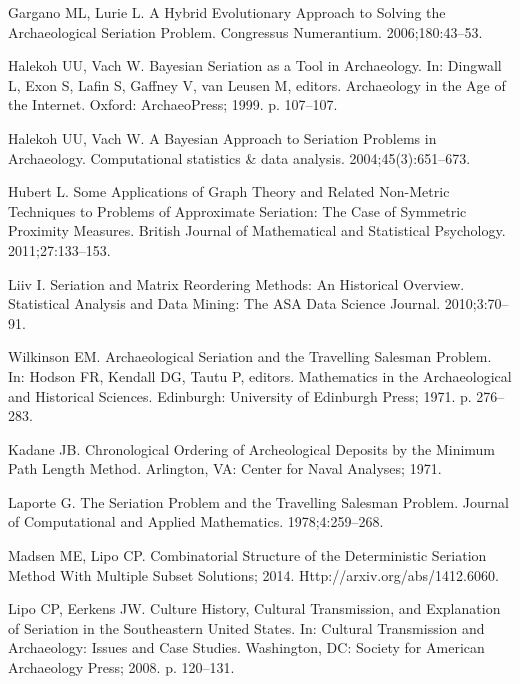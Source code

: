 \documentclass[10pt,letterpaper]{article}
\begin{document}
\begin{thebibliography}{10}
Gargano ML, Lurie L.
\newblock A Hybrid Evolutionary Approach to Solving the Archaeological
  Seriation Problem.
\newblock Congressus Numerantium. 2006;180:43--53.

Halekoh UU, Vach W.
\newblock Bayesian Seriation as a Tool in Archaeology.
\newblock In: Dingwall L, Exon S, Lafin S, Gaffney V, van Leusen M, editors.
  Archaeology in the Age of the Internet. Oxford: ArchaeoPress; 1999. p.
  107--107.

Halekoh UU, Vach W.
\newblock A Bayesian Approach to Seriation Problems in Archaeology.
\newblock Computational statistics \& data analysis. 2004;45(3):651--673.

Hubert L.
\newblock Some Applications of Graph Theory and Related Non-Metric Techniques
  to Problems of Approximate Seriation: The Case of Symmetric Proximity
  Measures.
\newblock British Journal of Mathematical and Statistical Psychology.
  2011;27:133--153.

Liiv I.
\newblock Seriation and Matrix Reordering Methods: An Historical Overview.
\newblock Statistical Analysis and Data Mining: The ASA Data Science Journal.
  2010;3:70--91.

Wilkinson EM.
\newblock Archaeological Seriation and the Travelling Salesman Problem.
\newblock In: Hodson FR, Kendall DG, Tautu P, editors. Mathematics in the
  Archaeological and Historical Sciences. Edinburgh: University of Edinburgh
  Press; 1971. p. 276--283.

Kadane JB.
\newblock Chronological Ordering of Archeological Deposits by the Minimum Path
  Length Method.
\newblock Arlington, VA: Center for Naval Analyses; 1971.

Laporte G.
\newblock The Seriation Problem and the Travelling Salesman Problem.
\newblock Journal of Computational and Applied Mathematics. 1978;4:259--268.

Madsen ME, Lipo CP.
\newblock Combinatorial Structure of the Deterministic Seriation Method With
  Multiple Subset Solutions; 2014.
\newblock Http://arxiv.org/abs/1412.6060.

Lipo CP, Eerkens JW.
\newblock Culture History, Cultural Transmission, and Explanation of Seriation
  in the Southeastern United States.
\newblock In: Cultural Transmission and Archaeology: Issues and Case Studies.
  Washington, DC: Society for American Archaeology Press; 2008. p. 120--131.


\end{thebibliography}
\end{document}
